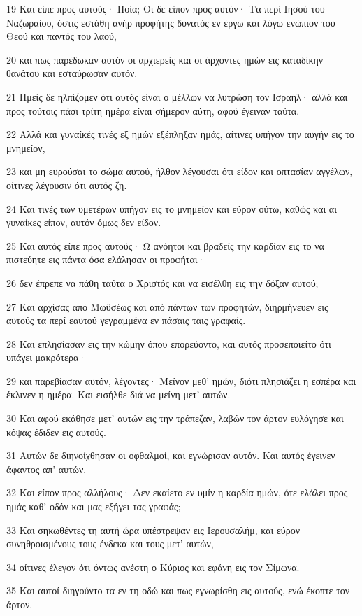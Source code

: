 \par 19 Και είπε προς αυτούς· Ποία; Οι δε είπον προς αυτόν· Τα περί Ιησού του Ναζωραίου, όστις εστάθη ανήρ προφήτης δυνατός εν έργω και λόγω ενώπιον του Θεού και παντός του λαού,
\par 20 και πως παρέδωκαν αυτόν οι αρχιερείς και οι άρχοντες ημών εις καταδίκην θανάτου και εσταύρωσαν αυτόν.
\par 21 Ημείς δε ηλπίζομεν ότι αυτός είναι ο μέλλων να λυτρώση τον Ισραήλ· αλλά και προς τούτοις πάσι τρίτη ημέρα είναι σήμερον αύτη, αφού έγειναν ταύτα.
\par 22 Αλλά και γυναίκές τινές εξ ημών εξέπληξαν ημάς, αίτινες υπήγον την αυγήν εις το μνημείον,
\par 23 και μη ευρούσαι το σώμα αυτού, ήλθον λέγουσαι ότι είδον και οπτασίαν αγγέλων, οίτινες λέγουσιν ότι αυτός ζη.
\par 24 Και τινές των υμετέρων υπήγον εις το μνημείον και εύρον ούτω, καθώς και αι γυναίκες είπον, αυτόν όμως δεν είδον.
\par 25 Και αυτός είπε προς αυτούς· Ω ανόητοι και βραδείς την καρδίαν εις το να πιστεύητε εις πάντα όσα ελάλησαν οι προφήται·
\par 26 δεν έπρεπε να πάθη ταύτα ο Χριστός και να εισέλθη εις την δόξαν αυτού;
\par 27 Και αρχίσας από Μωϋσέως και από πάντων των προφητών, διηρμήνευεν εις αυτούς τα περί εαυτού γεγραμμένα εν πάσαις ταις γραφαίς.
\par 28 Και επλησίασαν εις την κώμην όπου επορεύοντο, και αυτός προσεποιείτο ότι υπάγει μακρότερα·
\par 29 και παρεβίασαν αυτόν, λέγοντες· Μείνον μεθ' ημών, διότι πλησιάζει η εσπέρα και έκλινεν η ημέρα. Και εισήλθε διά να μείνη μετ' αυτών.
\par 30 Και αφού εκάθησε μετ' αυτών εις την τράπεζαν, λαβών τον άρτον ευλόγησε και κόψας έδιδεν εις αυτούς.
\par 31 Αυτών δε διηνοίχθησαν οι οφθαλμοί, και εγνώρισαν αυτόν. Και αυτός έγεινεν άφαντος απ' αυτών.
\par 32 Και είπον προς αλλήλους· Δεν εκαίετο εν υμίν η καρδία ημών, ότε ελάλει προς ημάς καθ' οδόν και μας εξήγει τας γραφάς;
\par 33 Και σηκωθέντες τη αυτή ώρα υπέστρεψαν εις Ιερουσαλήμ, και εύρον συνηθροισμένους τους ένδεκα και τους μετ' αυτών,
\par 34 οίτινες έλεγον ότι όντως ανέστη ο Κύριος και εφάνη εις τον Σίμωνα.
\par 35 Και αυτοί διηγούντο τα εν τη οδώ και πως εγνωρίσθη εις αυτούς, ενώ έκοπτε τον άρτον.
